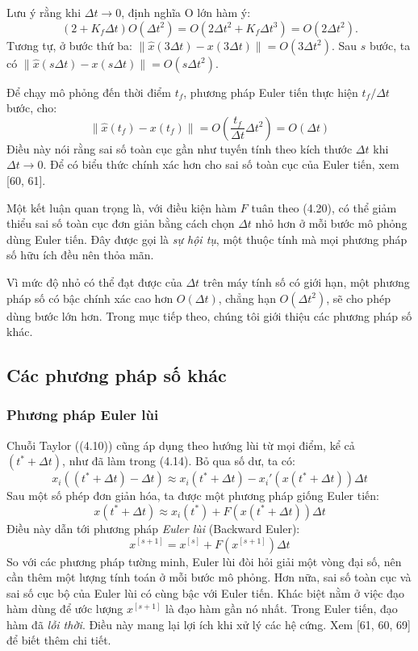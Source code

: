 Lưu ý rằng khi $\Delta t\to0$, định nghĩa O lớn hàm ý:
\[(2+K_f\Delta t)O(\Delta t^2)=O(2\Delta t^2+K_f\Delta t^3)=O(2\Delta t^2).\]
Tương tự, ở bước thứ ba: $\lVert\hat x(3\Delta t)-x(3\Delta t)\rVert=O(3\Delta t^2)$. Sau $s$ bước, ta có $\lVert\hat x(s\Delta t)-x(s\Delta t)\rVert=O(s\Delta t^2)$.

Để chạy mô phỏng đến thời điểm $t_f$, phương pháp Euler tiến thực hiện $t_f/\Delta t$ bước, cho:
\[\lVert\hat x(t_f)-x(t_f)\rVert=O\left(\frac{t_f}{\Delta t}\Delta t^2\right)=O(\Delta t)\]
Điều này nói rằng sai số toàn cục gần như tuyến tính theo kích thước $\Delta t$ khi $\Delta t\to0$. Để có biểu thức chính xác hơn cho sai số toàn cục của Euler tiến, xem [60, 61].

Một kết luận quan trọng là, với điều kiện hàm $F$ tuân theo (4.20), có thể giảm thiểu sai số toàn cục đơn giản bằng cách chọn $\Delta t$ nhỏ hơn ở mỗi bước mô phỏng dùng Euler tiến. Đây được gọi là \emph{sự hội tụ}, một thuộc tính mà mọi phương pháp số hữu ích đều nên thỏa mãn.

Vì mức độ nhỏ có thể đạt được của $\Delta t$ trên máy tính số có giới hạn, một phương pháp số có bậc chính xác cao hơn $O(\Delta t)$, chẳng hạn $O(\Delta t^2)$, sẽ cho phép dùng bước lớn hơn. Trong mục tiếp theo, chúng tôi giới thiệu các phương pháp số khác.

\subsection{Các phương pháp số khác}
\subsubsection{Phương pháp Euler lùi}
Chuỗi Taylor ((4.10)) cũng áp dụng theo hướng lùi từ mọi điểm, kể cả $(t^*+\Delta t)$, như đã làm trong (4.14). Bỏ qua số dư, ta có:
\[x_i((t^*+\Delta t)-\Delta t)\approx x_i(t^*+\Delta t)-x_i'(x(t^*+\Delta t))\Delta t\]
Sau một số phép đơn giản hóa, ta được một phương pháp giống Euler tiến:
\begin{equation}x(t^*+\Delta t)\approx x_i(t^*)+F(x(t^*+\Delta t))\Delta t\tag{4.22}\end{equation}
Điều này dẫn tới phương pháp \emph{Euler lùi} (Backward Euler):
\begin{equation}x^{[s+1]}=x^{[s]}+F(x^{[s+1]})\Delta t\tag{4.23}\end{equation}
So với các phương pháp tường minh, Euler lùi đòi hỏi giải một vòng đại số, nên cần thêm một lượng tính toán ở mỗi bước mô phỏng. Hơn nữa, sai số toàn cục và sai số cục bộ của Euler lùi có cùng bậc với Euler tiến. Khác biệt nằm ở việc đạo hàm dùng để ước lượng $x^{[s+1]}$ là đạo hàm gần nó nhất. Trong Euler tiến, đạo hàm đã \emph{lỗi thời}. Điều này mang lại lợi ích khi xử lý các hệ cứng. Xem [61, 60, 69] để biết thêm chi tiết.

